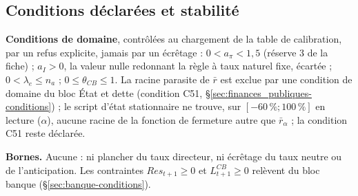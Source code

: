 \documentclass[11pt,a4paper]{article}
\begin{document}
\subsection{Conditions déclarées et stabilité}
\label{sec:banque_centrale-conditions}
\begin{proposee}
\textbf{Conditions de domaine}, contrôlées au chargement de la table de calibration, par un refus explicite, jamais par un écrêtage : $0 < a_\pi < 1{,}5$ (réserve 3 de la fiche) ; $a_I > 0$, la valeur nulle redonnant la règle à taux naturel fixe, écartée ; $0 < \lambda_e \le n_a$ ; $0 \le \theta_{\mathit{CB}} \le 1$. La racine parasite de $\bar r$ est exclue par une condition de domaine du bloc État et dette (condition C51, \S\ref{sec:finances_publiques-conditions}) ; le script d'état stationnaire ne trouve, sur $[-60\,\% ; 100\,\%]$ en lecture ($\alpha$), aucune racine de la fonction de fermeture autre que $\bar r_\alpha$ ; la condition C51 reste déclarée.

\textbf{Bornes.} Aucune : ni plancher du taux directeur, ni écrêtage du taux neutre ou de l'anticipation. Les contraintes $\mathit{Res}_{t+1} \ge 0$ et $L^{\mathit{CB}}_{t+1} \ge 0$ relèvent du bloc banque (\S\ref{sec:banque-conditions}).


\end{proposee}
\end{document}
